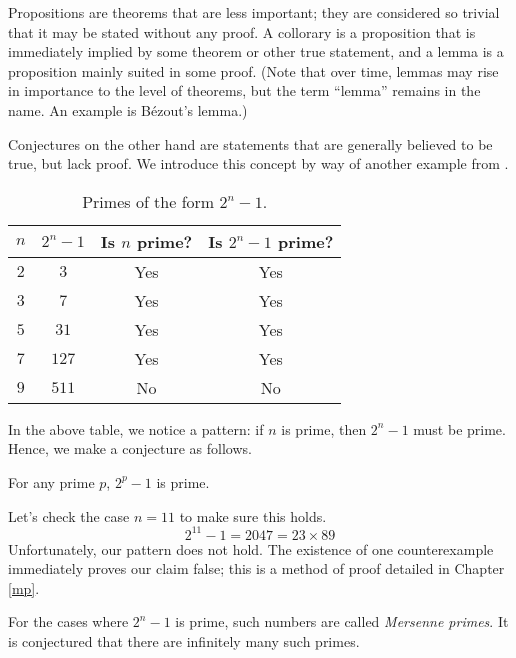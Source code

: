 Propositions are theorems that are less important; they are considered so trivial that it may be stated
without any proof. A collorary is a proposition that is immediately implied by some theorem or other true
statement, and a lemma is a proposition mainly suited in some proof. (Note that over time, lemmas may
rise in importance to the level of theorems, but the term ``lemma'' remains in the name. An example is
B\'{e}zout's lemma.)

Conjectures on the other hand are statements that are generally believed to be true, but lack proof. We introduce
this concept by way of another example from \cite{Velleman_2019}.

\begin{table}[h]
    \centering
    \begin{tabular}{|c|c|c|c|}
        \hline
        $n$ & $2^n - 1$ & Is $n$ prime? & Is $2^n - 1$ prime? \\ \hline
        $2$ & $3$       & Yes           & Yes                 \\ \hline
        $3$ & $7$       & Yes           & Yes                 \\ \hline
        $5$ & $31$      & Yes           & Yes                 \\ \hline
        $7$ & $127$     & Yes           & Yes                 \\ \hline
        $9$ & $511$     & No            & No                  \\ \hline
    \end{tabular}
    \caption{Primes of the form $2^n - 1$.}
    \label{tab:mersenne-test}
\end{table}

In the above table, we notice a pattern: if $n$ is prime, then $2^n - 1$ must be prime. Hence, we make a conjecture as
follows.

\begin{conjecture}
    For any prime $p$, $2^p - 1$ is prime.
\end{conjecture}

Let's check the
case $n = 11$ to make sure this holds.
\[
2^{11} - 1 = 2047 = 23 \times 89
\]
Unfortunately, our pattern does not hold. The existence of one counterexample immediately proves our claim false;
this is a method of proof detailed in Chapter \ref{mp}.

For the cases where $2^n - 1$ is prime, such numbers are called
\textit{Mersenne primes}. It is conjectured that there are infinitely many such primes.

